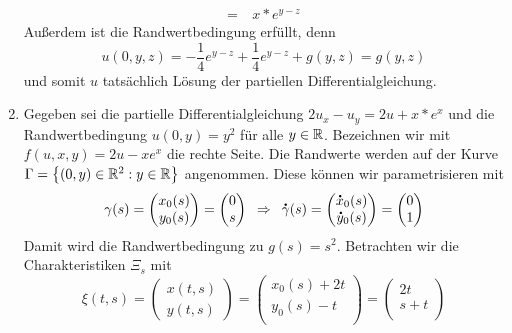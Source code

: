 \begin{exercisePage}[Charakteristikenmethode]
\begin{enumerate}[label=(zu \alph*), leftmargin=*]
\begin{equation*}
\begin{aligned}
				= \ &
				x * e^{y-z}
			\end{aligned}
		\end{equation*}
		Außerdem ist die Randwertbedingung erfüllt, denn
		\begin{equation*}
			u(0,y,z) = -\frac{1}{4} e^{y-z} + \frac{1}{4} e^{y-z} + g(y, z) = g(y,z)
		\end{equation*}
		und somit $u$ tatsächlich Lösung der partiellen Differentialgleichung.
		\item Gegeben sei die partielle Differentialgleichung $2u_x - u_y = 2u + x*e^x$ und die Randwertbedingung $u(0,y) = y^2$ für alle $y \in \mathbb{R}$. Bezeichnen wir mit $f(u,x,y) = 2u - x e^x$  die rechte Seite.  Die Randwerte werden auf der Kurve $\Gamma = \left\{ (0,y) \in \mathbb{R}^2 : y \in \mathbb{R} \right\}$ angenommen. Diese können wir parametrisieren mit 
		\begin{equation*}
			\gamma(s) = 
			\begin{pmatrix} 
				x_0(s) \\ 
				y_0(s) 
			\end{pmatrix} 
			= 
			\begin{pmatrix}
				0 \\
				s
			\end{pmatrix}
			\enskip \Rightarrow \enskip \accentset{\mbox{\large\bfseries .}}{\gamma}(s) =
			\begin{pmatrix} 
				\accentset{\mbox{\large\bfseries .}}{x}_0(s) \\ 
				\accentset{\mbox{\large\bfseries .}}{y}_0(s) 
			\end{pmatrix} 
			= 
			\begin{pmatrix}
				0 \\
				1
			\end{pmatrix}
		\end{equation*}
		Damit wird die Randwertbedingung zu $g(s) = s^2$. Betrachten wir die Charakteristiken $\Xi_s$ mit
		\begin{equation} \label{2eq: c-charakteristiken}
			\xi(t, s) =
			\begin{pmatrix}
				x(t, s) \\
				y(t, s)
			\end{pmatrix}
			= 
			\begin{pmatrix}
				x_0(s) + 2t \\
				y_0(s) - t \\
			\end{pmatrix}
			=
			\begin{pmatrix}
				2t \\
				s + t \\
			\end{pmatrix}
		\end{equation}

\end{enumerate}
\end{exercisePage}
